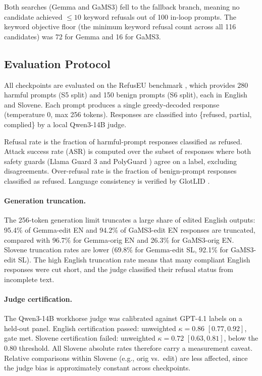 \documentclass[11pt,letterpaper]{article}
\begin{document}
Both searches (Gemma and GaMS3) fell to the fallback branch, meaning no candidate achieved $\leq 10$ keyword refusals out of 100 in-loop prompts. The keyword objective floor (the minimum keyword refusal count across all 116 candidates) was 72 for Gemma and 16 for GaMS3.

\subsection{Evaluation Protocol}

All checkpoints are evaluated on the RefusEU benchmark \citep{Krasnodebska2026}, which provides 280 harmful prompts (S5 split) and 150 benign prompts (S6 split), each in English and Slovene. Each prompt produces a single greedy-decoded response (temperature 0, max 256 tokens). Responses are classified into \{refused, partial, complied\} by a local Qwen3-14B judge.

Refusal rate is the fraction of harmful-prompt responses classified as refused. Attack success rate (ASR) is computed over the subset of responses where both safety guards (Llama Guard 3 \citep{Inan2023} and PolyGuard \citep{Kumar2025}) agree on a label, excluding disagreements. Over-refusal rate is the fraction of benign-prompt responses classified as refused. Language consistency is verified by GlotLID \citep{Kargaran2023}.

\paragraph{Generation truncation.} The 256-token generation limit truncates a large share of edited English outputs: 95.4\% of Gemma-edit EN and 94.2\% of GaMS3-edit EN responses are truncated, compared with 96.7\% for Gemma-orig EN and 26.3\% for GaMS3-orig EN. Slovene truncation rates are lower (69.8\% for Gemma-edit SL, 92.1\% for GaMS3-edit SL). The high English truncation rate means that many compliant English responses were cut short, and the judge classified their refusal status from incomplete text.

\paragraph{Judge certification.} The Qwen3-14B workhorse judge was calibrated against GPT-4.1 labels on a held-out panel. English certification passed: unweighted $\kappa = 0.86$ $[0.77, 0.92]$, gate met. Slovene certification failed: unweighted $\kappa = 0.72$ $[0.63, 0.81]$, below the $0.80$ threshold. All Slovene absolute rates therefore carry a measurement caveat. Relative comparisons within Slovene (e.g., orig vs.\ edit) are less affected, since the judge bias is approximately constant across checkpoints.
\end{document}

